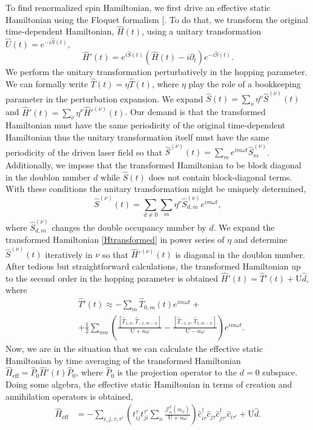 \documentclass[aps,prl,twocolumn,amsmath,amssymb,nobibnotes]{revtex4-1}%
\renewcommand{\cite}[1]{{[}\onlinecite{#1}{]}}
\newcommand{\n}{\nonumber}
\begin{document}
To find renormalized spin Hamiltonian, we first drive an effective static Hamiltonian using the Floquet formalism \cite{Floquet1,Floquet2}. To do that, we transform the original time-dependent Hamiltonian, $\hat{H}(t)$, using a unitary transformation $\hat{U}(t) = e^{-i\hat{S}(t)}$,
\begin{equation}
\hat{H}'(t) = e^{i\hat{S}(t)} \left(\hat{H}(t)  -  i\partial_t \right) e^{-i\hat{S}(t)}.
\label{Htransformed}
\end{equation}
We perform the unitary transformation perturbatively in the hopping parameter. We can formally write $\hat{T}(t) = \eta \hat{T}(t)$, where $\eta$ play the role of a bookkeeping parameter in the perturbation expansion. We expand $\hat{S}(t) = \sum_\nu \eta^\nu \hat{S}^{(\nu)}(t)$ and $\hat{H}'(t) = \sum_\nu \eta^\nu \hat{H}'^{(\nu)}(t)$. Our demand is that the transformed Hamiltonian must have the same periodicity of the original time-dependent Hamiltonian thus the unitary transformation itself must have the same periodicity of the driven laser field so that $\hat{S}^{(\nu)}(t) = \sum_m e^{im\omega t}\hat{S}^{(\nu)}_m$. Additionally, we impose that the transformed Hamiltonian to be block diagonal in the doublon number $d$ while $\hat{S}(t)$ does not contain block-diagonal terms. With these conditions the unitary transformation might be uniquely determined,
\begin{equation}
\hat{S}^{(\nu)}(t) = \sum_{d \neq 0} \sum_m \eta^\nu \hat{S}^{(\nu)}_{d,m} e^{im\omega t},
\end{equation}
where $\hat{S}^{(\nu)}_{d,m}$ changes the double occupancy number by $d$. We expand the transformed Hamiltonian \ref{Htransformed} in power series of $\eta$ and determine $\hat{S}^{(\nu)}(t)$ iteratively in $\nu$ so that $\hat{H}'^{(\nu)}(t)$ is diagonal in the doublon number. After tedious but straightforward calculations, the transformed Hamiltonian up to the second order in the hopping parameter is obtained $\hat{H}'(t)= \hat{T}'(t)+\text{U}\hat{d}$, where
\begin{align}
\label{transformedH}
&\hat{T}'(t) \approx  - \sum_m \hat{T}_{0,m}(t)e^{im\omega t} + \n \\
&+ \frac{1}{2}\sum_{mn} \left( \frac{\left[\hat{T}_{1,n}, \hat{T}_{-1,m-n} \right]}{\text{U}+n\omega} - \frac{\left[\hat{T}_{-1,n}, \hat{T}_{1,m-n} \right]}{\text{U}-n\omega} \right) e^{im\omega t}.
\end{align}
Now, we are in the situation that we can calculate the effective static Hamiltonian by time averaging of the transformed Hamiltonian $\hat{H}_{\text{eff}}=\hat{P}_0\hat{H}'(t)\hat{P}_0$, where $\hat{P}_0$ is the projection operator to the $d=0$ subspace.
Doing some algebra, the effective static Hamiltonian in terms of creation and annihilation operators is obtained,
\begin{align}
\hat{H}_{\text{eff}} &= - \sum_{i,j, \tau, \tau'} \left(t_{ij}^{\tau} t_{ji}^{\tau'} \sum_{n} \frac{\mathcal{J}_{n}^2(\alpha_{ij})}{\text{U}+n\omega} \right)  \hat{c}_{i \tau}^\dagger \hat{c}_{j \tau} \hat{c}_{j \tau'}^\dagger \hat{c}_{i \tau'}+\text{U}\hat{d}. \label{GeneralHeff}
\end{align}
\end{document}
